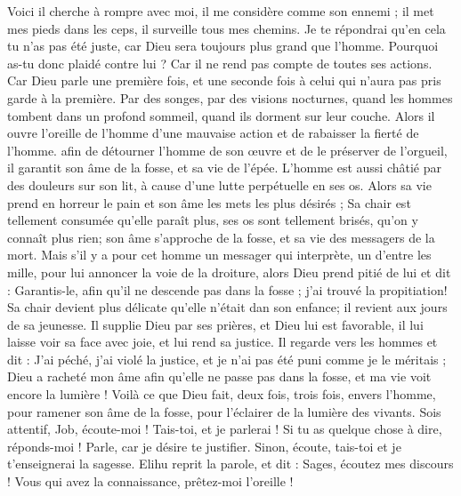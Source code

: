 \begin{multicols}{2}
Voici il cherche à rompre avec moi, il me considère comme son ennemi ;
il met mes pieds dans les ceps, il surveille tous mes chemins.
Je te répondrai qu'en cela tu n'as pas été juste, car Dieu sera toujours plus grand que l'homme.
Pourquoi as-tu donc plaidé contre lui ? Car il ne rend pas compte de toutes ses actions.
Car Dieu parle une première fois, et une seconde fois à celui qui n'aura pas pris garde à la première.
Par des songes, par des visions nocturnes, quand les hommes tombent dans un profond sommeil, quand ils dorment sur leur couche.
Alors il ouvre l'oreille de l'homme d'une mauvaise action et de rabaisser la fierté de l'homme.
afin de détourner l'homme de son œuvre et de le préserver de l'orgueil,
il garantit son âme de la fosse, et sa vie de l'épée.
L'homme est aussi châtié par des douleurs sur son lit, à cause d'une lutte perpétuelle en ses os.
Alors sa vie prend en horreur le pain et son âme les mets les plus désirés ;
Sa chair est tellement consumée qu'elle paraît plus, ses os sont tellement brisés, qu'on y connaît plus rien;
son âme s'approche de la fosse, et sa vie des messagers de la mort.
Mais s'il y a pour cet homme un messager qui interprète, un d'entre les mille, pour lui annoncer la voie de la droiture,
alors Dieu prend pitié de lui et dit : Garantis-le, afin qu'il ne descende pas dans la fosse ; j'ai trouvé la propitiation!
Sa chair devient plus délicate qu'elle n'était dan son enfance; il revient aux jours de sa jeunesse.
Il supplie Dieu par ses prières, et Dieu lui est favorable, il lui laisse voir sa face avec joie, et lui rend sa justice.
Il regarde vers les hommes et dit : J'ai péché, j'ai violé la justice, et je n'ai pas été puni comme je le méritais ;
Dieu a racheté mon âme afin qu'elle ne passe pas dans la fosse, et ma vie voit encore la lumière !
Voilà ce que Dieu fait, deux fois, trois fois, envers l'homme,
pour ramener son âme de la fosse, pour l'éclairer de la lumière des vivants.
Sois attentif, Job, écoute-moi ! Tais-toi, et je parlerai !
Si tu as quelque chose à dire, réponds-moi ! Parle, car je désire te justifier.
Sinon, écoute, tais-toi et je t'enseignerai la sagesse.
\VerseOne{}Elihu reprit la parole, et dit :
Sages, écoutez mes discours ! Vous qui avez la connaissance, prêtez-moi l'oreille !

\end{multicols}
